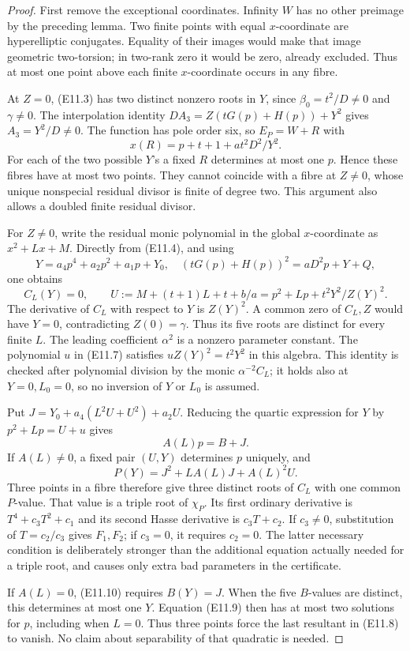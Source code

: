 \begin{proof}
First remove the exceptional coordinates. Infinity $W$ has no other
preimage by the preceding lemma. Two finite points with equal
$x$-coordinate are hyperelliptic conjugates. Equality of their images
would make that image geometric two-torsion; in two-rank zero it would
be zero, already excluded. Thus at most one point above each finite
$x$-coordinate occurs in any fibre.

At $Z=0$, (E11.3) has two distinct nonzero roots in $Y$, since
$\beta_0=t^2/D\ne0$ and $\gamma\ne0$. The interpolation identity
$DA_3=Z(tG(p)+H(p))+Y^2$ gives $A_3=Y^2/D\ne0$.
The function has pole order six, so $E_P=W+R$ with
\[
 x(R)=p+t+1+at^2D^2/Y^2.
\]
For each of the two possible $Y$'s a fixed $R$ determines at most one
$p$. Hence these fibres have at most two points. They cannot coincide
with a fibre at $Z\ne0$, whose unique nonspecial residual divisor is
finite of degree two. This argument also allows a doubled finite
residual divisor.

For $Z\ne0$, write the residual monic polynomial in the global
$x$-coordinate as $x^2+Lx+M$. Directly from (E11.4), and using
\[
 Y=a_4p^4+a_2p^2+a_1p+Y_0,\quad
 (tG(p)+H(p))^2=aD^2p+Y+Q,
\]
one obtains
\[
 C_L(Y)=0,\qquad
 U:=M+(t+1)L+t+b/a=p^2+Lp+t^2Y^2/Z(Y)^2.       \tag{E11.9}
\]
The derivative of $C_L$ with respect to $Y$ is $Z(Y)^2$.
A common zero of $C_L,Z$ would have $Y=0$, contradicting
$Z(0)=\gamma$. Thus its five roots are distinct for every finite $L$.
The leading coefficient $\alpha^2$ is a nonzero parameter constant.
The polynomial $u$ in (E11.7) satisfies
$uZ(Y)^2=t^2Y^2$ in this algebra. This identity is checked after
polynomial division by the monic $\alpha^{-2}C_L$; it holds also at
$Y=0,L_0=0$, so no inversion of $Y$ or $L_0$ is assumed.

Put $J=Y_0+a_4(L^2U+U^2)+a_2U$.
Reducing the quartic expression for $Y$ by $p^2+Lp=U+u$ gives
\[
                  A(L)p=B+J.                  \tag{E11.10}
\]
If $A(L)\ne0$, a fixed pair $(U,Y)$ determines $p$ uniquely, and
\[
              P(Y)=J^2+LA(L)J+A(L)^2U.
\]
Three points in a fibre therefore give three distinct roots of $C_L$
with one common $P$-value. That value is a triple root of $\chi_P$.
Its first ordinary derivative is $T^4+c_3T^2+c_1$ and its second
Hasse derivative is $c_3T+c_2$. If $c_3\ne0$, substitution of
$T=c_2/c_3$ gives $F_1,F_2$; if $c_3=0$, it requires $c_2=0$.
The latter necessary condition is deliberately stronger than the
additional equation actually needed for a triple root, and causes
only extra bad parameters in the certificate.

If $A(L)=0$, (E11.10) requires $B(Y)=J$. When the five $B$-values
are distinct, this determines at most one $Y$. Equation (E11.9)
then has at most two solutions for $p$, including when $L=0$.
Thus three points force the last resultant in (E11.8) to vanish.
No claim about separability of that quadratic is needed.
\end{proof}

